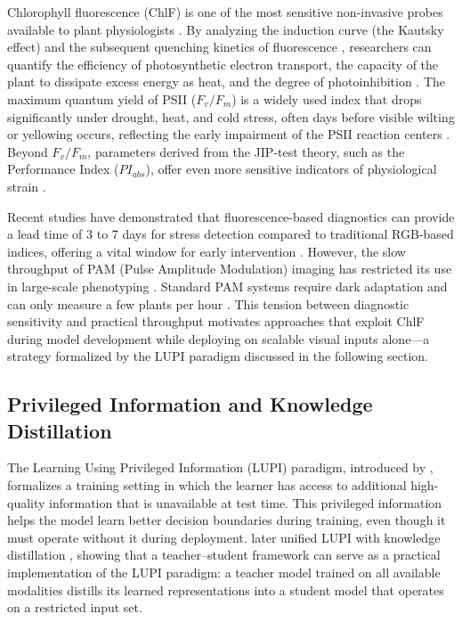 \documentclass[a4paper,fleqn]{cas-dc}
\begin{document}
Chlorophyll fluorescence (ChlF) is one of the most sensitive non-invasive probes available to plant physiologists \citep{maxwellChlorophyllFluorescencePractical2000}. By analyzing the induction curve (the Kautsky effect) and the subsequent quenching kinetics of fluorescence \citep{bakerChlorophyllFluorescenceProbe2008}, researchers can quantify the efficiency of photosynthetic electron transport, the capacity of the plant to dissipate excess energy as heat, and the degree of photoinhibition \citep{bakerChlorophyllFluorescenceProbe2008}. The maximum quantum yield of PSII ($F_v/F_m$) is a widely used index that drops significantly under drought, heat, and cold stress, often days before visible wilting or yellowing occurs, reflecting the early impairment of the PSII reaction centers \citep{murchieChlorophyllFluorescenceAnalysis2013}. Beyond $F_v/F_m$, parameters derived from the JIP-test theory, such as the Performance Index ($PI_{abs}$), offer even more sensitive indicators of physiological strain \citep{oukarroumProbingResponsesBarley2007}.

Recent studies have demonstrated that fluorescence-based diagnostics can provide a lead time of 3 to 7 days for stress detection compared to traditional RGB-based indices, offering a vital window for early intervention \citep{kalajiChlorophyllFluorescenceUseful2011}. However, the slow throughput of PAM (Pulse Amplitude Modulation) imaging has restricted its use in large-scale phenotyping \citep{schreiberPulseAmplitudeModulationPAMFluorometry2004}. Standard PAM systems require dark adaptation and can only measure a few plants per hour \citep{furbankPhenomicsTechnologiesRelieve2011}. This tension between diagnostic sensitivity and practical throughput motivates approaches that exploit ChlF during model development while deploying on scalable visual inputs alone---a strategy formalized by the LUPI paradigm discussed in the following section.

\subsection{Privileged Information and Knowledge Distillation}\label{sec:related:lupi}

The Learning Using Privileged Information (LUPI) paradigm, introduced by \citet{vapnikNewLearningParadigm2009}, formalizes a training setting in which the learner has access to additional high-quality information that is unavailable at test time. This privileged information helps the model learn better decision boundaries during training, even though it must operate without it during deployment. \citet{lopez-pazUnifyingDistillationPrivileged2016} later unified LUPI with knowledge distillation \citep{hintonDistillingKnowledgeNeural2015}, showing that a teacher--student framework can serve as a practical implementation of the LUPI paradigm: a teacher model trained on all available modalities distills its learned representations into a student model that operates on a restricted input set.
\end{document}
